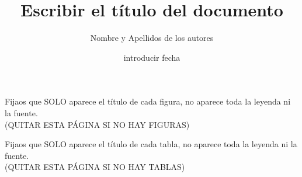 \documentclass[11pt,a4paper,spanish]{book}
\title{Escribir el título del documento}
\author{Nombre y Apellidos de los autores}
\date{introducir fecha}
\begin{document}
\renewcommand{\listfigurename}{Índice de figuras}
\renewcommand{\listtablename}{Índice de tablas}
\renewcommand{\contentsname}{Índice de contenidos}
\renewcommand{\figurename}{Figura}
\renewcommand{\tablename}{Tabla} 

\maketitle
\frontmatter
\tableofcontents
\listoffigures
Fijaos que SOLO aparece el título de cada figura, no aparece toda la leyenda ni la fuente. \\
(QUITAR ESTA PÁGINA SI NO HAY FIGURAS) 
\listoftables
Fijaos que SOLO aparece el título de cada tabla, no aparece toda la leyenda ni la fuente. \\
(QUITAR ESTA PÁGINA SI NO HAY TABLAS)




\mainmatter







\end{document}

